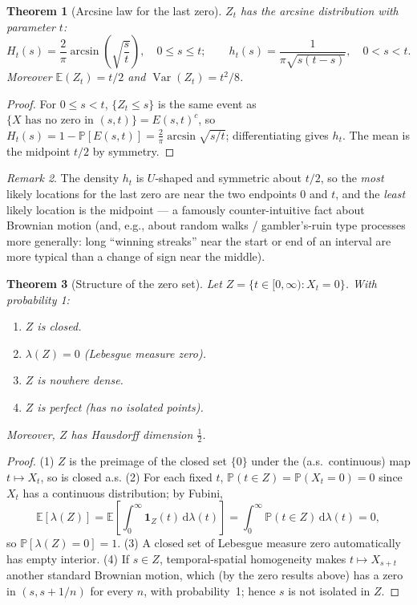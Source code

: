 \documentclass[12pt,openany]{book}
\newtheorem{theorem}{Theorem}[section]
\theoremstyle{definition}
\theoremstyle{remark}
\newtheorem{remark}[theorem]{Remark}
\newcommand{\E}{\mathbb{E}}
\newcommand{\Prob}{\mathbb{P}}
\newcommand{\ii}{\mathbf{1}}
\newcommand{\dd}{\,\mathrm{d}}
\DeclareMathOperator{\Var}{Var}
\begin{document}
\begin{theorem}[Arcsine law for the last zero]
$Z_t$ has the \emph{arcsine distribution} with parameter $t$:
\begin{equation}
    H_t(s) = \frac{2}{\pi}\arcsin\!\left(\sqrt{\frac st}\right), \quad 0 \le s \le t; \qquad h_t(s) = \frac{1}{\pi\sqrt{s(t-s)}}, \quad 0<s<t. \tag{18.1.34, 18.1.35}
\end{equation}
Moreover $\E(Z_t) = t/2$ and $\Var(Z_t) = t^2/8$.
\end{theorem}
\begin{proof}
For $0\le s<t$, $\{Z_t \le s\}$ is the same event as $\{X \text{ has no zero in }(s,t)\} = E(s,t)^c$, so $H_t(s) = 1-\Prob[E(s,t)] = \frac2\pi\arcsin\sqrt{s/t}$; differentiating gives $h_t$. The mean is the midpoint $t/2$ by symmetry.
\end{proof}
 
\begin{remark}
The density $h_t$ is $U$-shaped and symmetric about $t/2$, so the \emph{most} likely locations for the last zero are near the two endpoints $0$ and $t$, and the \emph{least} likely location is the midpoint — a famously counter-intuitive fact about Brownian motion (and, e.g., about random walks / gambler's-ruin type processes more generally: long ``winning streaks'' near the start or end of an interval are more typical than a change of sign near the middle).
\end{remark}
 
\begin{theorem}[Structure of the zero set]
Let $Z = \{t\in[0,\infty): X_t=0\}$. With probability 1:
\begin{enumerate}[label=(\arabic*)]
    \item $Z$ is closed.
    \item $\lambda(Z) = 0$ (Lebesgue measure zero).
    \item $Z$ is nowhere dense.
    \item $Z$ is perfect (has no isolated points).
\end{enumerate}
Moreover, $Z$ has Hausdorff dimension $\tfrac12$.
\end{theorem}
\begin{proof}
(1) $Z$ is the preimage of the closed set $\{0\}$ under the (a.s.\ continuous) map $t \mapsto X_t$, so is closed a.s. (2) For each fixed $t$, $\Prob(t \in Z) = \Prob(X_t=0)=0$ since $X_t$ has a continuous distribution; by Fubini,
\[
    \E[\lambda(Z)] = \E\left[\int_0^\infty \ii_Z(t)\dd\lambda(t)\right] = \int_0^\infty \Prob(t\in Z)\dd\lambda(t) = 0,
\]
so $\Prob[\lambda(Z)=0]=1$. (3) A closed set of Lebesgue measure zero automatically has empty interior. (4) If $s \in Z$, temporal-spatial homogeneity makes $t \mapsto X_{s+t}$ another standard Brownian motion, which (by the zero results above) has a zero in $(s,s+1/n)$ for every $n$, with probability~1; hence $s$ is not isolated in $Z$.
\end{proof}
 
\end{document}
